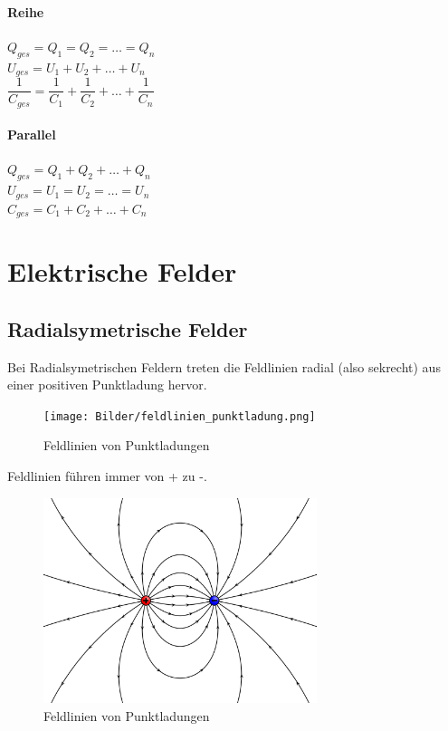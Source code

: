 \documentclass[a4paper]{article}
\begin{document}
\paragraph{Reihe}

\begin{center}
	\Large
		$Q_{ges} = Q_1 = Q_2 = … = Q_n$\\[0,5cm]
		$U_{ges} = U_1 + U_2 + … + U_n$\\[0,5cm]
		$\dfrac{1}{C_{ges}} = \dfrac{1}{C_1} + \dfrac{1}{C_2} + … + \dfrac{1}{C_n}$\\[1cm]
	\normalsize
\end{center}


\paragraph{Parallel}

\begin{center}
	\Large
		$Q_{ges} = Q_1 + Q_2 + … + Q_n$\\[0,5cm]
		$U_{ges} = U_1 = U_2 = … = U_n$\\[0,5cm]
		$C_{ges} = C_1 + C_2 + … + C_n$\\[1cm]
	\normalsize
\end{center}

\newpage \normalsize


\section{Elektrische Felder}

\subsection{Radialsymetrische Felder}
Bei Radialsymetrischen Feldern treten die Feldlinien radial (also sekrecht)
aus einer positiven Punktladung hervor.

\begin{figure} [h]
	\begin{center}
		\texttt{[image: Bilder/feldlinien\_punktladung.png]}
		\caption{Feldlinien von Punktladungen}
	\end{center}
\end{figure}

Feldlinien führen immer von + zu -.

\begin{figure} [h]
	\begin{center}
		\includegraphics[width=8cm]{Bilder/field.png}
		\caption{Feldlinien von Punktladungen}
	\end{center}
\end{figure}
\end{document}
